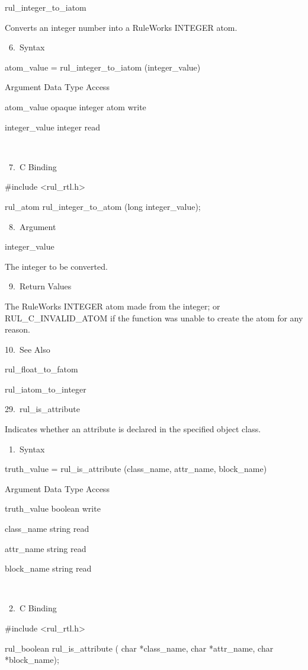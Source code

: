 {          rul_integer_to_iatom

          Converts an integer number into a
          RuleWorks INTEGER atom.

       6. Syntax

          atom_value = rul_integer_to_iatom
          (integer_value)

          Argument  Data Type    Access

          atom_value  opaque integer atom
           write

          integer_value  integer    read

           

       7. C Binding

          #include <rul_rtl.h>

          rul_atom rul_integer_to_atom (long
          integer_value);

       8. Argument

          integer_value

          The integer to be converted.

       9. Return Values

          The RuleWorks INTEGER atom made from
          the integer; or RUL_C_INVALID_ATOM
          if the function was unable to create
          the atom for any reason.

      10. See Also

    rul_float_to_fatom

    rul_iatom_to_integer

29. rul_is_attribute

    Indicates whether an attribute is declared
    in the specified object class.

       1. Syntax

          truth_value = rul_is_attribute
          (class_name, attr_name, block_name)

          Argument  Data Type   Access

          truth_value  boolean   write

          class_name  string   read

          attr_name  string   read

          block_name  string   read

           

       2. C Binding

          #include <rul_rtl.h>

          rul_boolean rul_is_attribute (
          char *class_name,
          char *attr_name,
          char *block_name);

}
